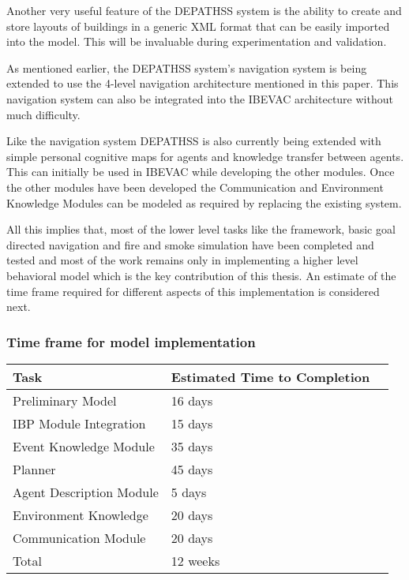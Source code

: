 Another very useful feature of the DEPATHSS system is the ability to create and store layouts of buildings in a generic XML format that can be easily imported into the model. This will be invaluable during experimentation and validation.

As mentioned earlier, the DEPATHSS system's navigation system is being extended to use the 4-level navigation architecture mentioned in this paper. This navigation system can also be integrated into the IBEVAC architecture without much difficulty.

Like the navigation system DEPATHSS is also currently being extended with simple personal cognitive maps for agents and knowledge transfer between agents. This can initially be used in IBEVAC while developing the other modules. Once the other modules have been developed the Communication and Environment Knowledge Modules can be modeled as required by replacing the existing system.

All this implies that, most of the lower level tasks like the framework, basic goal directed navigation and fire and smoke simulation have been completed and tested and most of the work remains only in implementing a higher level behavioral model which is the key contribution of this thesis. An estimate of the time frame required for different aspects of this implementation is considered next.

\subsubsection{Time frame for model implementation}
\label{CFW:TimeFrame}

\begin{table}[tbp]
\centering
{} %
\begin{tabular}{p{2.5in}   p{1.25in}   p{1.25in}} %
\hline\hline %
Task & Estimated Time to Completion \\
\hline
Preliminary Model  & 16 days \\[3pt]
IBP Module Integration  & 15 days \\[3pt]
Event Knowledge Module    & 35 days \\[3pt]
Planner   				& 45 days \\[3pt]
Agent Description Module  & 5 days \\[3pt]
Environment Knowledge     & 20 days \\[3pt]
Communication Module 	& 20 days \\[3pt]
\hline
Total & 12 weeks \\[3pt]
\bottomrule
\end{tabular}
\label{tab:Implementation}
\end{table}

